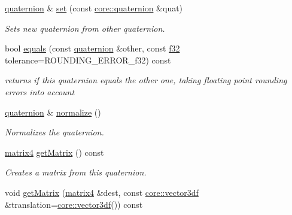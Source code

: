 \begin{DoxyCompactItemize}
\hyperlink{classirr_1_1core_1_1quaternion}{quaternion} \& \hyperlink{classirr_1_1core_1_1quaternion_aa99cf40ab088323e5fc31ccdbe9fa2ad}{set} (const \hyperlink{classirr_1_1core_1_1quaternion}{core\+::quaternion} \&quat)
\begin{DoxyCompactList}\small\item\em Sets new quaternion from other quaternion. \end{DoxyCompactList}\item 
\mbox{\label{classirr_1_1core_1_1quaternion_a3b659f864cfce80be65b44ecf565566c}} 
bool \hyperlink{classirr_1_1core_1_1quaternion_a3b659f864cfce80be65b44ecf565566c}{equals} (const \hyperlink{classirr_1_1core_1_1quaternion}{quaternion} \&other, const \hyperlink{namespaceirr_a0277be98d67dc26ff93b1a6a1d086b07}{f32} tolerance=R\+O\+U\+N\+D\+I\+N\+G\+\_\+\+E\+R\+R\+O\+R\+\_\+f32) const
\begin{DoxyCompactList}\small\item\em returns if this quaternion equals the other one, taking floating point rounding errors into account \end{DoxyCompactList}\item 
\mbox{\label{classirr_1_1core_1_1quaternion_aac7a34ffd2a14a78de12d994539b94f9}} 
\hyperlink{classirr_1_1core_1_1quaternion}{quaternion} \& \hyperlink{classirr_1_1core_1_1quaternion_aac7a34ffd2a14a78de12d994539b94f9}{normalize} ()
\begin{DoxyCompactList}\small\item\em Normalizes the quaternion. \end{DoxyCompactList}\item 
\mbox{\label{classirr_1_1core_1_1quaternion_a23c2056aa77d1d53b2cebce7cf05ea47}} 
\hyperlink{namespaceirr_1_1core_a73fa92e638c5ca97efd72da307cc9b65}{matrix4} \hyperlink{classirr_1_1core_1_1quaternion_a23c2056aa77d1d53b2cebce7cf05ea47}{get\+Matrix} () const
\begin{DoxyCompactList}\small\item\em Creates a matrix from this quaternion. \end{DoxyCompactList}\item 
void \hyperlink{classirr_1_1core_1_1quaternion_a333ab73cbc2b334ea9f5fe6a5a66058e}{get\+Matrix} (\hyperlink{namespaceirr_1_1core_a73fa92e638c5ca97efd72da307cc9b65}{matrix4} \&dest, const \hyperlink{namespaceirr_1_1core_a06f169d08b5c429f5575acb7edbad811}{core\+::vector3df} \&translation=\hyperlink{namespaceirr_1_1core_a06f169d08b5c429f5575acb7edbad811}{core\+::vector3df}()) const

\end{DoxyCompactItemize}
